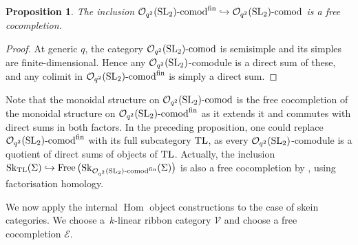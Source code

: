 \documentclass[pdftex]{sigma}%
\numberwithin{equation}{section}
\newtheorem{Proposition}[Theorem]{Proposition}
 { \theoremstyle{definition}
\newtheorem{Definition}[Theorem]{Definition}
\newtheorem{Note}[Theorem]{Note}
\newtheorem{Example}[Theorem]{Example}
\newtheorem{Remark}[Theorem]{Remark} }
\newcommand{\Free}{\operatorname{Free}}
\newcommand{\Hom}{\operatorname{Hom}}
\newcommand{\Oqcomfin}{\Oq\text{-}{\rm comod}^{\rm fin}}
\newcommand{\Oqcom}{\Oq\text{-}{\rm comod}}
\newcommand{\Oq}{\mathcal{O}_{q^2}({\rm SL}_2)}
\begin{document}
\begin{Proposition}\label{propOqFree}
The inclusion $\Oq\text{-}{\rm comod}^{\rm fin} \hookrightarrow \Oq\text{-}{\rm comod}$ is a free cocompletion.
\end{Proposition}
\begin{proof}
At generic $q$, the category $\Oqcom$ is semisimple and its simples are finite-dimen\-sio\-nal. Hence any $\Oq$-comodule is a direct sum of these, and any colimit in \linebreak $\Oqcomfin$ is simply a direct sum.
\end{proof}

Note that the monoidal structure on $\Oqcom$ is the free cocompletion of the monoidal structure on $\Oqcomfin$ as it extends it and commutes with direct sums in both factors.
In the preceding proposition, one could replace $\Oqcomfin$ with its full subcategory ${\rm TL}$, as every $\Oq$-comodule is a quotient of direct sums of objects of ${\rm TL}$. Actually, the inclusion ${\rm Sk}_{{\rm TL}}(\Sigma) \hookrightarrow \Free\big({\rm Sk}_{\Oqcomfin}(\Sigma)\big)$ is also a free cocompletion by \cite[Theorems~2.28 and~3.27]{Cooke}, using factorisation homology.

We now apply the internal $\Hom$ object constructions to the case of skein categories. We choose a~$k$-linear ribbon category $\mathcal{V}$ and choose a free cocompletion $\mathcal{E}$.
\end{document}
